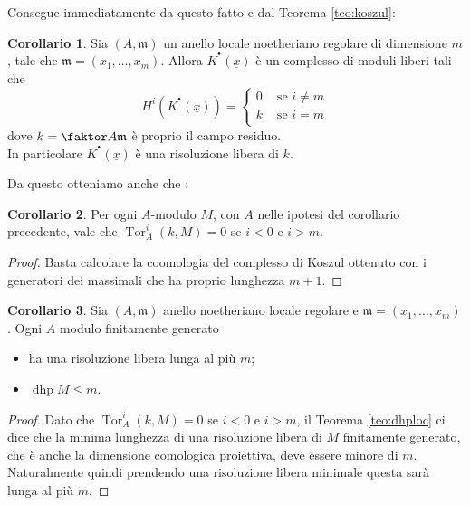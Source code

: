 \documentclass[a4paper,11pt,oneside]{book}
\newcommand{\m}{\mathfrak{m}}
\newcommand{\complx}[1]{#1^{^\bullet}}
\DeclareMathOperator{\Tor}{Tor}
\DeclareMathOperator{\dhp}{dhp}
\theoremstyle{definition}
\newtheorem{cor}{Corollario}
\begin{document}
    Consegue immediatamente da questo fatto e dal Teorema \ref{teo:koszul}:
    
    \begin{cor}
     Sia $(A,\m)$ un anello locale noetheriano regolare di dimensione $m$, tale che $\m=(x_1,\dots, x_{m})$. 
     Allora $\complx{K}(\underline{x})$ è un complesso di moduli liberi tali che
     \[
      H^i(\complx K (\underline x))=
      \begin{cases}
       0 & \text{ se } i\neq m \\
       k & \text{ se } i= m \\
      \end{cases}
     \]
     dove $k=\faktor A {\m}$ è proprio il campo residuo. \\
     In particolare  $\complx{K}(\underline{x})$ è una risoluzione libera di $k$.
    \end{cor}

    Da questo otteniamo anche che :
     \begin{cor}
      Per ogni $A$-modulo $M$, con $A$ nelle ipotesi del corollario precedente, vale che
      $\Tor_A^i(k,M)=0$ se $i<0$ e $i>m$.
     \end{cor}

     \begin{proof}
      Basta calcolare la coomologia del complesso di Koszul ottenuto con i generatori dei massimali che ha proprio lunghezza $m+1$.
     \end{proof}

     
    \begin{cor}\label{cor:regfingen}
     Sia $(A,\m)$ anello noetheriano locale regolare e $\m=(x_1,\dots, x_{m})$. Ogni $A$ modulo finitamente generato
     \begin{itemize}
      \item ha una risoluzione libera lunga al più $m$;
      \item $\dhp M\leq m$.
     \end{itemize}
    \end{cor}

    \begin{proof}
     Dato che $\Tor_A^i(k,M)=0$ se $i<0$ e $i>m$, il Teorema \ref{teo:dhploc} ci dice che la minima lunghezza di una risoluzione libera
     di $M$ finitamente generato, che è anche la dimensione comologica proiettiva, deve essere minore di $m$. Naturalmente quindi 
     prendendo una risoluzione libera minimale questa sarà lunga al più $m$.
    \end{proof}
\end{document}
